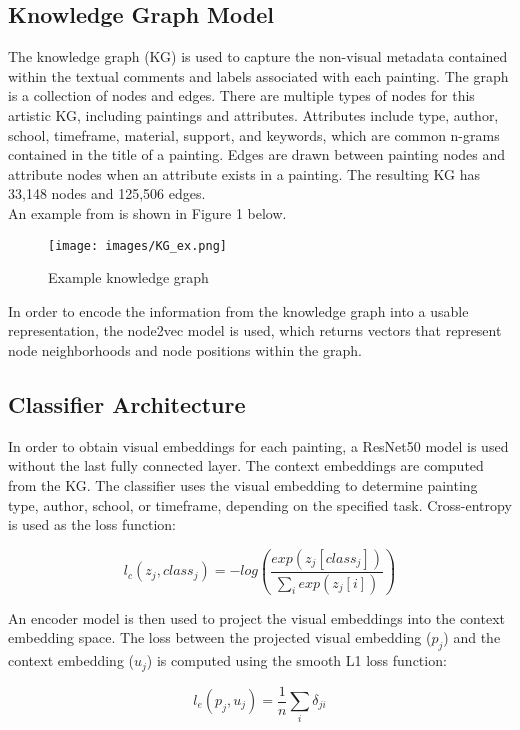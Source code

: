 \documentclass{article}
\begin{document}
\subsection{Knowledge Graph Model}
The knowledge graph (KG) is used to capture the non-visual metadata contained within the textual comments and labels associated with each painting. The graph is a collection of nodes and edges. There are multiple types of nodes for this artistic KG, including paintings and attributes. Attributes include type, author, school, timeframe, material, support, and keywords, which are common n-grams contained in the title of a painting. Edges are drawn between painting nodes and attribute nodes when an attribute exists in a painting. The resulting KG has 33,148 nodes and 125,506 edges. \\
An example from \cite{Garcia2017Context} is shown in Figure 1 below. 

\begin{figure}[h]
    \centering
    \texttt{[image: images/KG\_ex.png]}
    \caption{Example knowledge graph}
\end{figure}

In order to encode the information from the knowledge graph into a usable representation, the node2vec model is used, which returns vectors that represent node neighborhoods and node positions within the graph.

\subsection{Classifier Architecture}
In order to obtain visual embeddings for each painting, a ResNet50 \cite{ResNet} model is used without the last fully connected layer. The context embeddings are computed from the KG. The classifier uses the visual embedding to determine painting type, author, school, or timeframe, depending on the specified task. Cross-entropy is used as the loss function: 

\begin{equation}\label{E:1}
l_c(z_j, {class}_j) = -log \left( \frac{exp(z_j[class_j])}{\sum_i exp(z_j[i])}\right)
\end{equation}

An encoder model is then used to project the visual embeddings into the context embedding space. The loss between the projected visual embedding ($p_j$) and the context embedding ($u_j$) is computed using the smooth L1 loss function: 

\begin{equation}\label{E:2}
l_e(p_j, u_j) = \frac{1}{n}\sum_i \delta_{ji}
\end{equation}
\end{document}
